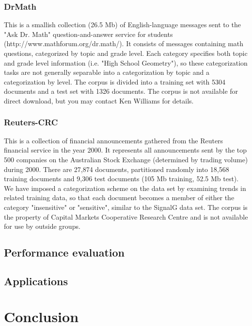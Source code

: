 \documentclass[a4paper]{report}
\begin{document}
\subsection{DrMath}
This is a smallish collection (26.5 Mb) of English-language messages
sent to the "Ask Dr. Math" question-and-answer service for students
(http://www.mathforum.org/dr.math/).  It consists of messages
containing math questions, categorized by topic and grade level.  Each
category specifies both topic and grade level information (i.e. "High
School Geometry"), so these categorization tasks are not generally
separable into a categorization by topic and a categorization by
level.  The corpus is divided into a training set with 5304 documents
and a test set with 1326 documents.  The corpus is not available for
direct download, but you may contact Ken Williams for details.


\subsection{Reuters-CRC}
This is a collection of financial announcements gathered from the
Reuters financial service in the year 2000.  It represents all
announcements sent by the top 500 companies on the Australian Stock
Exchange (determined by trading volume) during 2000.  There are 27,874
documents, partitioned randomly into 18,568 training documents and
9,306 test documents (105 Mb training, 52.5 Mb test).  We have imposed
a categorization scheme on the data set by examining trends in related
training data, so that each document becomes a member of either the
category "insensitive" or "sensitive", similar to the SignalG data
set.  The corpus is the property of Capital Markets Cooperative
Research Centre and is not available for use by outside groups.


\section{Performance evaluation}

\section{Applications}

\chapter{Conclusion}



\end{document}

